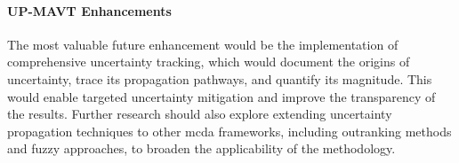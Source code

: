 \paragraph{UP-MAVT Enhancements}
The most valuable future enhancement would be the implementation of comprehensive uncertainty tracking, which would document the origins of uncertainty, trace its propagation pathways, and quantify its magnitude. This would enable targeted uncertainty mitigation and improve the transparency of the results.
Further research should also explore extending uncertainty propagation techniques to other \gls{mcda} frameworks, including outranking methods and fuzzy approaches, to broaden the applicability of the methodology.
